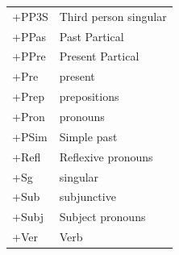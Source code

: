 \documentclass[11pt,letterpaper]{article}
\begin{document}
\begin{table}
\begin{tabular}{ll}
		+PP3S & Third person singular \\
		+PPas & Past Partical \\
		+PPre & Present Partical \\
		+Pre & present \\
		+Prep & prepositions \\
		+Pron & pronouns \\
		+PSim & Simple past \\
		+Refl & Reflexive pronouns \\
		+Sg & singular \\
		+Sub & subjunctive \\
		+Subj & Subject pronouns \\
		+Ver & Verb \\
    \end{tabular}
\end{table}


\label{lastpage}
\end{document}
